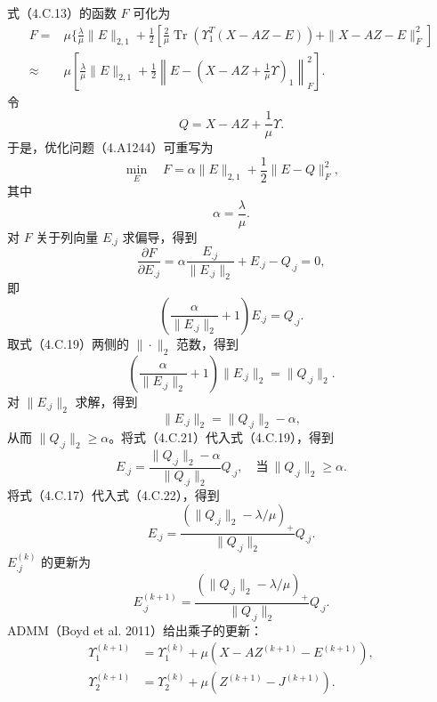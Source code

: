 式（4.C.13）的函数 $F$ 可化为
\begin{equation}
\begin{aligned}
F={}&\mu\biggl\{\frac\lambda\mu\|E\|_{2,1}
+\frac12\left[\frac2\mu\operatorname{Tr}(\Upsilon_1^T(X-AZ-E))
+\|X-AZ-E\|_F^2\right]\\
\approx{}&\mu\left[\frac\lambda\mu\|E\|_{2,1}
+\frac12\left\|E-\left(X-AZ+\frac1\mu\Upsilon\right)_1\right\|_F^2\right].
\end{aligned}\tag{4.C.14}
\end{equation}
令
\begin{equation}
Q=X-AZ+\frac1\mu\Upsilon.\tag{4.C.15}
\end{equation}
于是，优化问题（4.A1244）可重写为
\begin{equation}
\min_E\quad F=\alpha\|E\|_{2,1}+\frac12\|E-Q\|_F^2,\tag{4.C.16}
\end{equation}
其中
\begin{equation}
\alpha=\frac\lambda\mu.\tag{4.C.17}
\end{equation}
对 $F$ 关于列向量 $E_{.j}$ 求偏导，得到
\begin{equation}
\frac{\partial F}{\partial E_{.j}}
=\alpha\frac{E_{.j}}{\|E_{.j}\|_2}+E_{.j}-Q_{.j}=0,\tag{4.C.18}
\end{equation}
即
\begin{equation}
\left(\frac\alpha{\|E_{.j}\|_2}+1\right)E_{.j}=Q_{.j}.\tag{4.C.19}
\end{equation}
取式（4.C.19）两侧的 $\|\cdot\|_2$ 范数，得到
\begin{equation}
\left(\frac\alpha{\|E_{.j}\|_2}+1\right)\|E_{.j}\|_2=\|Q_{.j}\|_2.\tag{4.C.20}
\end{equation}
对 $\|E_{.j}\|_2$ 求解，得到
\begin{equation}
\|E_{.j}\|_2=\|Q_{.j}\|_2-\alpha,\tag{4.C.21}
\end{equation}
从而 $\|Q_{.j}\|_2\ge\alpha$。将式（4.C.21）代入式（4.C.19），得到
\begin{equation}
E_{.j}=\frac{\|Q_{.j}\|_2-\alpha}{\|Q_{.j}\|_2}Q_{.j},
\quad\text{当}\ \|Q_{.j}\|_2\ge\alpha.\tag{4.C.22}
\end{equation}
将式（4.C.17）代入式（4.C.22），得到
\begin{equation}
E_{.j}=\frac{(\|Q_{.j}\|_2-\lambda/\mu)_+}{\|Q_{.j}\|_2}Q_{.j}.\tag{4.C.23}
\end{equation}
$E_{.j}^{(k)}$ 的更新为
\begin{equation}
E_{.j}^{(k+1)}=\frac{(\|Q_{.j}\|_2-\lambda/\mu)_+}{\|Q_{.j}\|_2}Q_{.j}.\tag{4.C.24}
\end{equation}
ADMM（Boyd et al. 2011）给出乘子的更新：
\begin{equation}
\begin{aligned}
\Upsilon_1^{(k+1)}&=\Upsilon_1^{(k)}+\mu(X-AZ^{(k+1)}-E^{(k+1)}),\\
\Upsilon_2^{(k+1)}&=\Upsilon_2^{(k)}+\mu(Z^{(k+1)}-J^{(k+1)}).
\end{aligned}\tag{4.C.25}
\end{equation}
